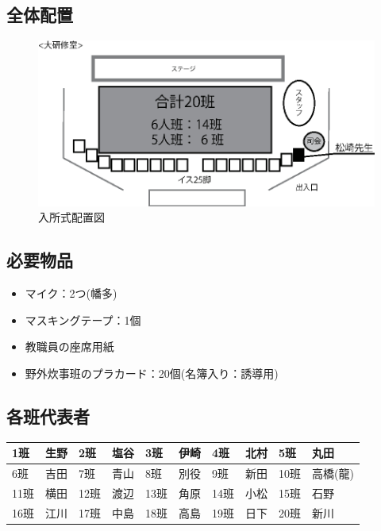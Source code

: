\subsection{全体配置}
\begin{figure}[H]
  \begin{center}
  \includegraphics[scale=1.5]{./08/nyushoshiki.eps}
  \caption{入所式配置図}
  \label{nyusyosiki}
  \end{center}
\end{figure}


\subsection{必要物品}
\begin{itemize}
\item マイク：2つ(幡多)
\item マスキングテープ：1個
\item 教職員の座席用紙
\item 野外炊事班のプラカード：20個(名簿入り：誘導用)
\end{itemize}


\subsection{各班代表者}
\begin{table}[htb]
  \begin{center}
  \begin{tabular}{|l|l||l|l||l|l||l|l||l|l|} \hline
  1班 & 生野 & 2班 & 塩谷 & 3班 & 伊崎 & 4班 & 北村 & 5班 & 丸田 \\ \hline
  6班 & 吉田 & 7班 & 青山 & 8班 & 別役 & 9班 & 新田 & 10班 & 高橋(龍) \\  \hline
  11班 & 横田 & 12班 & 渡辺 & 13班 & 角原 & 14班 & 小松 & 15班 & 石野 \\ \hline
  16班 & 江川 & 17班 & 中島 & 18班 & 高島 & 19班 & 日下 & 20班 & 新川 \\ \hline
    \end{tabular}
  \end{center}
\end{table}


